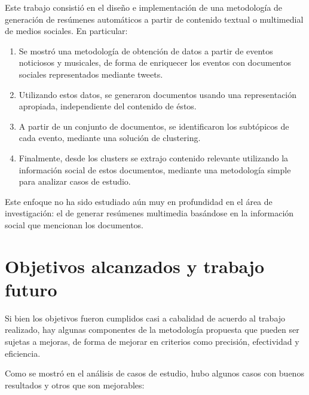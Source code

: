 \documentclass[upright, contnum]{umemoria}
\begin{document}
Este trabajo consistió en el diseño e implementación de una
metodología de generación de resúmenes automáticos a partir de
contenido textual o multimedial de medios sociales. En particular:

\begin{enumerate}
\item Se mostró una metodología de obtención de datos a partir de eventos
   noticiosos y musicales, de forma de enriquecer los eventos con
   documentos sociales representados mediante tweets.
\item Utilizando estos datos, se generaron documentos usando una
   representación apropiada, independiente del contenido de éstos.
\item A partir de un conjunto de documentos, se identificaron los
   subtópicos de cada evento, mediante una solución de clustering.
\item Finalmente, desde los clusters se extrajo contenido relevante
   utilizando la información social de estos documentos, mediante una
   metodología simple para analizar casos de estudio.
\end{enumerate}
Este enfoque no ha sido estudiado aún muy en profundidad en el área de
investigación: el de generar resúmenes multimedia basándose en la
información social que mencionan los documentos. 

\section{Objetivos alcanzados y trabajo futuro}
\label{sec-5.1}


Si bien los objetivos fueron cumplidos casi a cabalidad de acuerdo al
trabajo realizado, hay algunas componentes de la metodología propuesta
que pueden ser sujetas a mejoras, de forma de mejorar en criterios
como precisión, efectividad y eficiencia.

Como se mostró en el análisis de casos de estudio, hubo algunos casos
con buenos resultados y otros que son mejorables:
\end{document}
